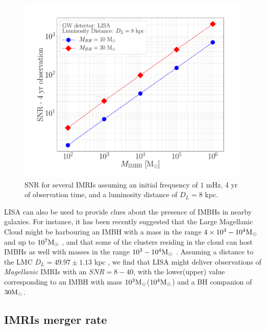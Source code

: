 \documentclass[twocolumn]{aastex62}
\newcommand{\Ms}{{\rm M}_\odot}
\begin{document}
{\begin{figure}
    \includegraphics[width=\columnwidth]{snr_MW}
    \caption{SNR for several IMRIs assuming an initial frequency of $1$ mHz, 4 yr of observation time, and a luminosity distance of $D_L = 8$ kpc.}
    \label{fig:my_label}
\end{figure}
LISA can also be used to provide clues about the presence of IMBHs in nearby galaxies. For instance, it has been recently suggested that the Large Magellanic Cloud might be harbouring an IMBH with a mass in the range $4\times 10^3-10^4\Ms$ \citep{erkal19} and up to $10^7\Ms$ \citep{boyce17}, and that some of the clusters residing in the cloud can host IMBHs as well with masses in the range $10^3-10^4\Ms$ \citep{gualandris07}. Assuming a distance to the LMC $D_L = 49.97 \pm 1.13$ kpc \citep{pietrzy13}, we find that LISA might deliver observations of {\it Magellanic} IMRIs with an $SNR = 8-40$, with the lower(upper) value corresponding to an IMBH with mass $10^3\Ms$($10^4\Ms$) and a BH companion of $30\Ms$. 
}

\subsection{IMRIs merger rate}
\end{document}
